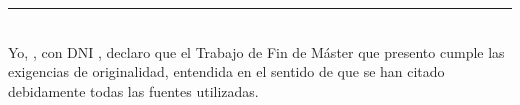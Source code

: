 \noindent\rule[-1ex]{\textwidth}{2pt}\\[4.5ex]

Yo, \textbf{\myName}, con DNI \dni, declaro que
el Trabajo de Fin de Máster que presento cumple las exigencias de originalidad,
entendida en el sentido de que se han citado debidamente todas las fuentes
utilizadas.

\vspace{6cm}


%
%
%
%
%
%
%
%
%
%
%
%

%
%
%
%
%
%
